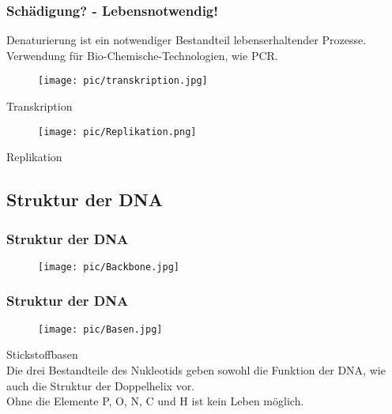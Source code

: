 \begin{frame}
\frametitle{Schädigung? - Lebensnotwendig!}
\vspace{0.1cm}
\centering
\small Denaturierung ist ein notwendiger Bestandteil lebenserhaltender Prozesse.
Verwendung für Bio-Chemische-Technologien, wie PCR.
\vspace{0.3cm}
  
\centering
		\begin{minipage}{7cm}
		\centering
\begin{figure}[h]
	\centering
		\texttt{[image: pic/transkription.jpg]}
\end{figure}
	\cite{TK14}
	Transkription
\end{minipage}
\begin{minipage}{5.0cm}
		\centering
\begin{figure}[h]
	\centering
		\texttt{[image: pic/Replikation.png]}
\end{figure}
	\cite{RK14}
	Replikation
\end{minipage}
\end{frame}

\subsection{Struktur der DNA}
\begin{frame}
\frametitle{Struktur der DNA}
		\centering
\begin{figure}[h]
	\centering
		\texttt{[image: pic/Backbone.jpg]}
\end{figure}
	\cite{BIO09}
\end{frame}

\begin{frame}
\frametitle{Struktur der DNA}
\begin{figure}[h]
	\centering
		\texttt{[image: pic/Basen.jpg]}
\end{figure}
\centering
	\cite{BIO09}
Stickstoffbasen\\
	\vspace{1cm}
Die drei Bestandteile des Nukleotids geben sowohl die Funktion der DNA, wie auch die Struktur der Doppelhelix vor.\\
\vspace{0.5cm}
Ohne die Elemente P, O, N, C und H ist kein Leben möglich.
\end{frame}

